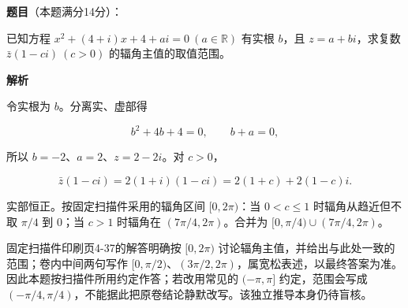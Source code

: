 \begin{answer}

\textbf{题目}（本题满分14分）：

已知方程 $x^2+(4+i)x+4+ai=0\ (a\in\mathbb R)$ 有实根 $b$，且 $z=a+bi$，求复数 $\bar z(1-ci)\ (c>0)$ 的辐角主值的取值范围。

\textbf{解析}

令实根为 $b$。分离实、虚部得

\nopagebreak[4]
\[
b^2+4b+4=0,\qquad b+a=0,
\]

所以 $b=-2$、$a=2$、$z=2-2i$。对 $c>0$，

\nopagebreak[4]
\[
\bar z(1-ci)=2(1+i)(1-ci)=2(1+c)+2(1-c)i.
\]

实部恒正。按固定扫描件采用的辐角区间 $[0,2\pi)$：当 $0<c\le1$ 时辐角从趋近但不取 $\pi/4$ 到 $0$；当 $c>1$ 时辐角在 $(7\pi/4,2\pi)$。合并为 $[0,\pi/4)\cup(7\pi/4,2\pi)$。

固定扫描件印刷页4-37的解答明确按 $[0,2\pi)$ 讨论辐角主值，并给出与此处一致的范围；卷内中间两句写作 $[0,\pi/2)$、$(3\pi/2,2\pi)$，属宽松表述，以最终答案为准。因此本题按扫描件所用约定作答；若改用常见的 $(-\pi,\pi]$ 约定，范围会写成 $(-\pi/4,\pi/4)$，不能据此把原卷结论静默改写。该独立推导本身仍待盲核。

\gkanswer{答案：$\left[0,\dfrac\pi4\right)\cup\left(\dfrac{7\pi}4,2\pi\right)$（卷内辐角区间取 $[0,2\pi)$）。}

\end{answer}
